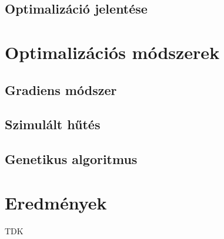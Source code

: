 \documentclass[12pt]{article}
\begin{document}
\subsection{Optimalizáció jelentése}
\section{Optimalizációs módszerek}
\subsection{Gradiens módszer}
\subsection{Szimulált hűtés}
\subsection{Genetikus algoritmus}
\section{Eredmények}
\begin{thebibliography}{9}
	TDK %
\end{thebibliography}
\end{document}
